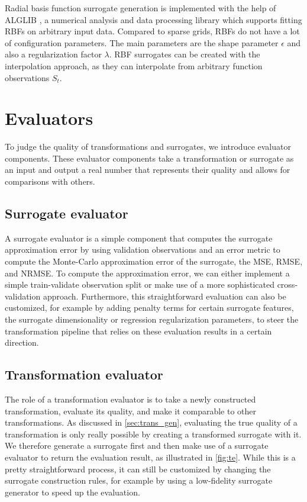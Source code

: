 \documentclass[
  a4paper,  %
  twoside,  %
  bibliography=totoc,
  headsepline,
  cleardoublepage=empty,
  parskip=half,
  draft=false
]{scrbook}
\begin{document}
Radial basis function surrogate generation is implemented with the help of ALGLIB \cite{Bochkanov}, a numerical analysis and data processing library which supports fitting RBFs on arbitrary input data.
Compared to sparse grids, RBFs do not have a lot of configuration parameters.
The main parameters are the shape parameter $\epsilon$ and also a regularization factor $\lambda$.
RBF surrogates can be created with the interpolation approach, as they can interpolate from arbitrary function observations $S_t$.

\section {Evaluators}

To judge the quality of transformations and surrogates, we introduce evaluator components.
These evaluator components take a transformation or surrogate as an input and output a real number that represents their quality and allows for comparisons with others.

\subsection {Surrogate evaluator}
\label{sec:se}

A surrogate evaluator is a simple component that computes the surrogate approximation error by using validation observations and an error metric to compute the Monte-Carlo approximation error of the surrogate, \eg the MSE, RMSE, and NRMSE.
To compute the approximation error, we can either implement a simple train-validate observation split or make use of a more sophisticated cross-validation approach.
Furthermore, this straightforward evaluation can also be customized, for example by adding penalty terms for certain surrogate features, \eg the surrogate dimensionality or regression regularization parameters, to steer the transformation pipeline that relies on these evaluation results in a certain direction.

\newpage
\subsection {Transformation evaluator}
\label{sec:te}

The role of a transformation evaluator is to take a newly constructed transformation, evaluate its quality, and make it comparable to other transformations.
As discussed in \cref{sec:trans_gen}, evaluating the true quality of a transformation is only really possible by creating a transformed surrogate with it.
We therefore generate a surrogate first and then make use of a surrogate evaluator to return the evaluation result, as illustrated in \cref{fig:te}.
While this is a pretty straightforward process, it can still be customized by changing the surrogate construction rules, for example by using a low-fidelity surrogate generator to speed up the evaluation.
\end{document}
